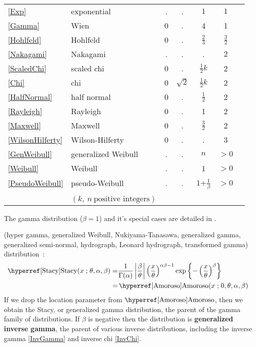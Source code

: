\begin{table*}[p]
\begin{center}
{\begin{tabular}{llccccl}
\eqref{Exp} & exponential & . & . & $1$ & $1$ \\
\eqref{Gamma} & Wien & 0 & . & 4& 1 \\
\eqref{Hohlfeld} & Hohlfeld & 0 & . & $\tfrac{2}{3}$ & $\tfrac{3}{2}$ \\
\eqref{Nakagami} & Nakagami & . & . & . & $2$ \\
\eqref{ScaledChi} &scaled chi& 0 & . & $\tfrac{1}{2}k$  & 2  \\
\eqref{Chi} & chi & 0 & $\sqrt{2}$ & $\tfrac{1}{2}k$ & 2 \\
\eqref{HalfNormal} & half normal & 0 & . & $\tfrac{1}{2}$ & 2 & \\  
\eqref{Rayleigh} & Rayleigh & 0 & . & 1 & 2  \\
\eqref{Maxwell} & Maxwell& 0 & . & $\frac{3}{2}$  & 2  \\
\eqref{WilsonHilferty} &Wilson-Hilferty& 0 & . & .  & 3  \\
\eqref{GenWeibull} & generalized Weibull  & . & . & $n$ & $>\!\!0$  \\
\eqref{Weibull} & Weibull & . & . & 1 &  $>\!\!0$  \\
\eqref{PseudoWeibull} & pseudo-Weibull & . & . & $1$+$\tfrac{1}{\beta}$ &  $>\!\!0$  \\
\\
& $(k,\ n\ \text{positive integers})$
\end{tabular} 
}
\end{center}
\end{table*}




The gamma distribution ($\beta=1$) and it's special cases are detailed in .

 (hyper gamma, generalized Weibull, Nukiyama-Tanasawa, generalized gamma, generalized semi-normal, hydrograph, Leonard hydrograph, transformed gamma)  distribution~\cite{Stacy1962,Dadpay2007}:
\begin{align}
\label{Stacy}
\opr{Stacy}(x \given \theta, \alpha, \beta) 
=& \frac{1}{\Gamma(\alpha)} \left|\frac{\beta}{\theta}\right| \left(\frac{x}{\theta}\right)^{\alpha\beta-1} 
\exp \left\{ -\left(\frac{x}{\theta}\right)^{\beta} \right\} \checked
\\=&  \opr{Amoroso}(x\given  0, \theta, \alpha, \beta) \notag \checked
\end{align}
If we drop the location parameter from $\opr{Amoroso}$, then we obtain the 
Stacy, or generalized gamma distribution, the parent of the gamma family of distributions.
If $\beta$ is negative then the distribution is  {\bf generalized inverse gamma}, the parent of various inverse distributions, including the inverse gamma \eqref{InvGamma} and inverse chi \eqref{InvChi}. 

